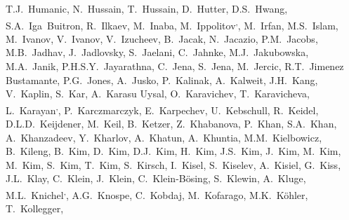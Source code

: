 \begin{flushleft}
T.J.~Humanic\And, 
N.~Hussain\And, 
T.~Hussain\And, 
D.~Hutter\And, 
D.S.~Hwang\And, 
S.A.~Iga~Buitron\And, 
R.~Ilkaev\And, 
M.~Inaba\And, 
M.~Ippolitov\textsuperscript{,}\And, 
M.~Irfan\And, 
M.S.~Islam\And, 
M.~Ivanov\And, 
V.~Ivanov\And, 
V.~Izucheev\And, 
B.~Jacak\And, 
N.~Jacazio\And, 
P.M.~Jacobs\And, 
M.B.~Jadhav\And, 
J.~Jadlovsky\And, 
S.~Jaelani\And, 
C.~Jahnke\And, 
M.J.~Jakubowska\And, 
M.A.~Janik\And, 
P.H.S.Y.~Jayarathna\And, 
C.~Jena\And, 
S.~Jena\And, 
M.~Jercic\And, 
R.T.~Jimenez Bustamante\And, 
P.G.~Jones\And, 
A.~Jusko\And, 
P.~Kalinak\And, 
A.~Kalweit\And, 
J.H.~Kang\And, 
V.~Kaplin\And, 
S.~Kar\And, 
A.~Karasu Uysal\And, 
O.~Karavichev\And, 
T.~Karavicheva\And, 
L.~Karayan\textsuperscript{,}\And, 
P.~Karczmarczyk\And, 
E.~Karpechev\And, 
U.~Kebschull\And, 
R.~Keidel\And, 
D.L.D.~Keijdener\And, 
M.~Keil\And, 
B.~Ketzer\And, 
Z.~Khabanova\And, 
P.~Khan\And, 
S.A.~Khan\And, 
A.~Khanzadeev\And, 
Y.~Kharlov\And, 
A.~Khatun\And, 
A.~Khuntia\And, 
M.M.~Kielbowicz\And, 
B.~Kileng\And, 
B.~Kim\And, 
D.~Kim\And, 
D.J.~Kim\And, 
H.~Kim\And, 
J.S.~Kim\And, 
J.~Kim\And, 
M.~Kim\And, 
M.~Kim\And, 
S.~Kim\And, 
T.~Kim\And, 
S.~Kirsch\And, 
I.~Kisel\And, 
S.~Kiselev\And, 
A.~Kisiel\And, 
G.~Kiss\And, 
J.L.~Klay\And, 
C.~Klein\And, 
J.~Klein\And, 
C.~Klein-B\"{o}sing\And, 
S.~Klewin\And, 
A.~Kluge\And, 
M.L.~Knichel\textsuperscript{,}\And, 
A.G.~Knospe\And, 
C.~Kobdaj\And, 
M.~Kofarago\And, 
M.K.~K\"{o}hler\And, 
T.~Kollegger\And, 

\end{flushleft}
